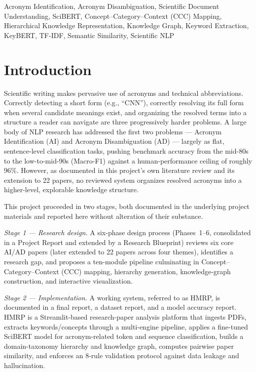 \documentclass[10pt,conference]{IEEEtran}
\begin{document}
\begin{IEEEkeywords}
Acronym Identification, Acronym Disambiguation, Scientific Document Understanding, SciBERT, Concept--Category--Context (CCC) Mapping, Hierarchical Knowledge Representation, Knowledge Graph, Keyword Extraction, KeyBERT, TF-IDF, Semantic Similarity, Scientific NLP
\end{IEEEkeywords}

\section{Introduction}
Scientific writing makes pervasive use of acronyms and technical abbreviations. Correctly detecting a short form (e.g., ``CNN''), correctly resolving its full form when several candidate meanings exist, and organizing the resolved terms into a structure a reader can navigate are three progressively harder problems. A large body of NLP research has addressed the first two problems --- Acronym Identification (AI) and Acronym Disambiguation (AD) --- largely as flat, sentence-level classification tasks, pushing benchmark accuracy from the mid-80s to the low-to-mid-90s (Macro-F1) against a human-performance ceiling of roughly 96\%. However, as documented in this project's own literature review and its extension to 22 papers, no reviewed system organizes resolved acronyms into a higher-level, explorable knowledge structure.

This project proceeded in two stages, both documented in the underlying project materials and reported here without alteration of their substance.

\emph{Stage 1 --- Research design.} A six-phase design process (Phases~1--6, consolidated in a Project Report and extended by a Research Blueprint) reviews six core AI/AD papers (later extended to 22 papers across four themes), identifies a research gap, and proposes a ten-module pipeline culminating in Concept--Category--Context (CCC) mapping, hierarchy generation, knowledge-graph construction, and interactive visualization.

\emph{Stage 2 --- Implementation.} A working system, referred to as HMRP, is documented in a final report, a dataset report, and a model accuracy report. HMRP is a Streamlit-based research-paper analysis platform that ingests PDFs, extracts keywords/concepts through a multi-engine pipeline, applies a fine-tuned SciBERT model for acronym-related token and sequence classification, builds a domain-taxonomy hierarchy and knowledge graph, computes pairwise paper similarity, and enforces an 8-rule validation protocol against data leakage and hallucination.
\end{document}
